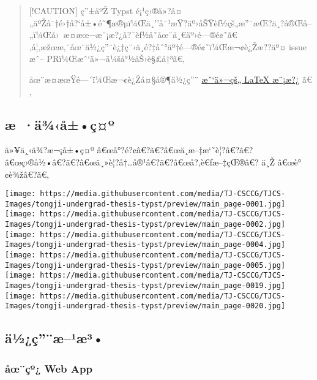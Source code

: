 \begin{quote}
{[}!CAUTION{]} ç''±äºŽ Typst
é¡¹ç›®ä»?å¤„äºŽå¯†é›†å?{}`å±•é˜¶æ®µï¼Œä¸''å¯¹æŸ?äº›åŠŸèƒ½çš„æ''¯æŒ?ä¸?å®Œå--„ï¼Œå›~æ­¤æœ¬æ¨¡æ?¿å?¯èƒ½å­˜åœ¨ä¸€äº›é---®é¢˜ã€‚å¦‚æžœæ‚¨åœ¨ä½¿ç''¨è¿‡ç¨‹ä¸­é?‡åˆ°äº†é---®é¢˜ï¼Œæ¬¢è¿Žæ??äº¤
issue æˆ-- PRï¼Œæˆ`ä»¬ä¼šå°½åŠ›è§£å†³ã€‚

åœ¨æ­¤æœŸé---´ï¼Œæ¬¢è¿Žå¤§å®¶ä½¿ç''¨
\href{https://github.com/TJ-CSCCG/tongji-undergrad-thesis}{æˆ`ä»¬çš„
LaTeX æ¨¡æ?¿} ã€‚
\end{quote}

\subsection{æ~·ä¾‹å±•ç¤º}\label{uxe6-uxe4uxbeuxe5uxe7uxba}

ä»¥ä¸‹ä¾?æ¬¡å±•ç¤º
â€œå°?é?¢â€?ã€?â€œä¸­æ--‡æ`˜è¦?â€?ã€?â€œç›®å½•â€?ã€?â€œä¸»è¦?å†\ldots å®¹â€?ã€?â€œå?‚è€ƒæ--‡çŒ®â€?
ä¸Ž â€œè°¢è¾žâ€?ã€‚

\texttt{[image: https://media.githubusercontent.com/media/TJ-CSCCG/TJCS-Images/tongji-undergrad-thesis-typst/preview/main\_page-0001.jpg]}
\texttt{[image: https://media.githubusercontent.com/media/TJ-CSCCG/TJCS-Images/tongji-undergrad-thesis-typst/preview/main\_page-0002.jpg]}
\texttt{[image: https://media.githubusercontent.com/media/TJ-CSCCG/TJCS-Images/tongji-undergrad-thesis-typst/preview/main\_page-0004.jpg]}
\texttt{[image: https://media.githubusercontent.com/media/TJ-CSCCG/TJCS-Images/tongji-undergrad-thesis-typst/preview/main\_page-0005.jpg]}
\texttt{[image: https://media.githubusercontent.com/media/TJ-CSCCG/TJCS-Images/tongji-undergrad-thesis-typst/preview/main\_page-0019.jpg]}
\texttt{[image: https://media.githubusercontent.com/media/TJ-CSCCG/TJCS-Images/tongji-undergrad-thesis-typst/preview/main\_page-0020.jpg]}

\subsection{ä½¿ç''¨æ--¹æ³•}\label{uxe4uxbduxe7uxe6uxb9uxe6uxb3}

\subsubsection{åœ¨çº¿ Web App}\label{uxe5ux153uxe7uxba-web-app}


